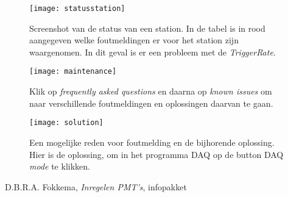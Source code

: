 \begin{figure} 
\centering 
\texttt{[image: statusstation]}
\caption{Screenshot van de status van een station. In de tabel is in rood aangegeven 
welke foutmeldingen er voor het station zijn waargenomen. 
In dit geval is er een probleem met de \emph{TriggerRate}.}\label{fig:statusstation} 
\end{figure}

\begin{figure} 
\centering 
\texttt{[image: maintenance]}
\caption{Klik op \emph{frequently asked questions} en daarna op
         \emph{known issues} om naar verschillende foutmeldingen en
         oplossingen daarvan te gaan.}\label{fig:maintenance} 
\end{figure}
 
\begin{figure} 
\centering 
\texttt{[image: solution]}
\caption{Een mogelijke reden voor foutmelding en de bijhorende
         oplossing. Hier is de oplossing, om in het programma \hisparc
         DAQ op de button DAQ \emph{mode} te klikken.} 
\label{fig:solution} 
\end{figure}


\begin{thebibliography}{9} 	
	 D.B.R.A. Fokkema, \emph{Inregelen PMT's}, infopakket \hisparc 
\end{thebibliography}


